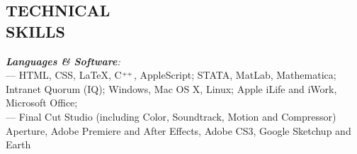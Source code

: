 \documentclass[margin]{res}
\begin{document}
\begin{resume}

\section{TECHNICAL \\ SKILLS} {\sl \textbf{Languages \& Software}:} \\
--- HTML, CSS, \LaTeX, C$^{\hbox{}_{++}}$, AppleScript; STATA, MatLab, Mathematica; Intranet Quorum (IQ); Windows, Mac OS X, Linux; Apple iLife and iWork, Microsoft Office;\\
--- Final Cut Studio (including Color, Soundtrack, Motion and Compressor)\\Aperture, Adobe Premiere and After Effects, Adobe CS3, Google Sketchup and Earth


\vfill

 
\end{resume}
\end{document}
